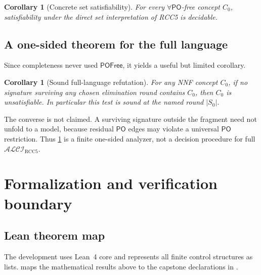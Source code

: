 \documentclass[11pt]{article}
\theoremstyle{plain}
\newtheorem{corollary}[theorem]{Corollary}
\theoremstyle{definition}
\theoremstyle{remark}
\newcommand{\Logic}{\ensuremath{\mathcal{ALCI}_{\mathrm{RCC5}}}}
\newcommand{\PO}{\ensuremath{\mathsf{PO}}}
\newcommand{\POFree}{\ensuremath{\mathsf{POFree}}}
\begin{document}
\begin{corollary}[Concrete set satisfiability]
For every $\forall\PO$-free concept $C_0$, satisfiability under the direct set
interpretation of RCC5 is decidable.
\end{corollary}

\subsection{A one-sided theorem for the full language}
\label{sec:fullunsat}

Since completeness never used $\POFree$, it yields a useful but limited
corollary.

\begin{corollary}[Sound full-language refutation]
\label{cor:fullunsat}
For any NNF concept $C_0$, if no signature surviving any chosen elimination
round contains $C_0$, then $C_0$ is unsatisfiable.  In particular this test is
sound at the named round $|S_0|$.
\end{corollary}

The converse is not claimed.  A surviving signature outside the fragment need
not unfold to a model, because residual $\PO$ edges may violate a universal
$\PO$ restriction.  Thus \cref{cor:fullunsat} is a finite one-sided analyzer,
not a decision procedure for full $\Logic$.

\section{Formalization and verification boundary}
\label{sec:formalization}

\subsection{Lean theorem map}

The development uses Lean~4 core and represents all finite control structures
as lists.   maps the mathematical results above to the
capstone declarations in  \cite{Artifact2026}.
\end{document}
